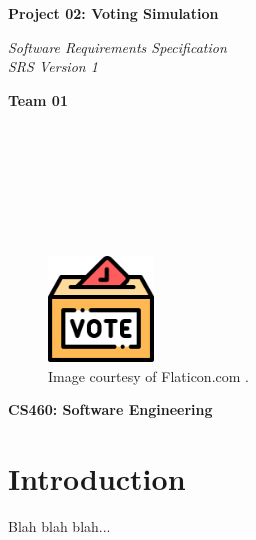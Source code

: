 \documentclass{article}
\begin{document}
\begin{titlepage}
\begin{center}
\vspace*{1cm}

\Huge
\textbf{Project 02: Voting Simulation}

\vspace{0.5cm}
\Large
\textit{Software Requirements Specification} \\
\textit{SRS Version 1}

\vspace{1cm}

\textbf{Team 01}

\vspace{0.5cm}

 \\
 \\
 \\
 \\
 \\
 \\

\vspace{1cm}

\begin{figure}[h]
    \centering
    \includegraphics[width=0.25\textwidth]{docs/srs/figures/ballot_icon.png}
    \caption*{Image courtesy of Flaticon.com \cite{Flaticon_2019}.}
    \label{fig:safeIcon}
\end{figure}

\vspace{7cm}

\Large
\textbf{CS460: Software Engineering} \\

\end{center}
\end{titlepage}

\newpage

\tableofcontents

\newpage

\section{Introduction}
Blah blah blah...
\end{document}
